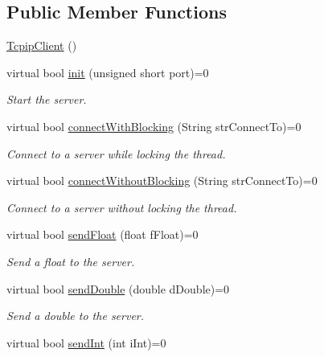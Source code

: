 \subsection*{Public Member Functions}
\begin{DoxyCompactItemize}
\item 
\hyperlink{class_rad_jav_1_1_networking_1_1_tcpip_client_a4a7f0e107204eab395962013d99f8b19}{Tcpip\+Client} ()
\item 
virtual bool \hyperlink{class_rad_jav_1_1_networking_1_1_tcpip_client_a183060b267be8fdbdf40d363f83b3c4a}{init} (unsigned short port)=0
\begin{DoxyCompactList}\small\item\em Start the server. \end{DoxyCompactList}\item 
virtual bool \hyperlink{class_rad_jav_1_1_networking_1_1_tcpip_client_a9ca02c63d90bc0b6d58c199878fc87cb}{connect\+With\+Blocking} (String str\+Connect\+To)=0
\begin{DoxyCompactList}\small\item\em Connect to a server while locking the thread. \end{DoxyCompactList}\item 
virtual bool \hyperlink{class_rad_jav_1_1_networking_1_1_tcpip_client_a7ee68f0894e296f63a2506cea432954f}{connect\+Without\+Blocking} (String str\+Connect\+To)=0
\begin{DoxyCompactList}\small\item\em Connect to a server without locking the thread. \end{DoxyCompactList}\item 
virtual bool \hyperlink{class_rad_jav_1_1_networking_1_1_tcpip_client_a5aa35f109fce85d7efc952ba3736a114}{send\+Float} (float f\+Float)=0
\begin{DoxyCompactList}\small\item\em Send a float to the server. \end{DoxyCompactList}\item 
virtual bool \hyperlink{class_rad_jav_1_1_networking_1_1_tcpip_client_a34c01edb47b70c2eba337be77e4fd84a}{send\+Double} (double d\+Double)=0
\begin{DoxyCompactList}\small\item\em Send a double to the server. \end{DoxyCompactList}\item 
virtual bool \hyperlink{class_rad_jav_1_1_networking_1_1_tcpip_client_acf5a720509909c3847b9ad41ca676769}{send\+Int} (int i\+Int)=0

\end{DoxyCompactItemize}
